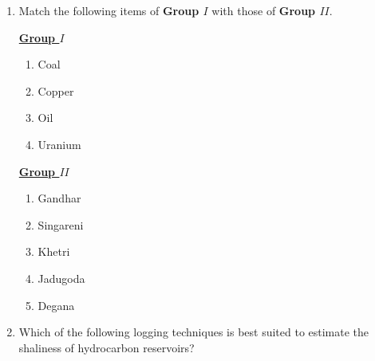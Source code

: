 \documentclass[journal,12pt,onecolumn]{IEEEtran}
\theoremstyle{remark}
\begin{document}
\begin{enumerate}
        \item Match the following items of \textbf{Group $I$} with those of \textbf{Group $II$}. \hfill{}

        \begin{multicols}{2}
            \underline{\textbf{Group $I$}}
            \begin{enumerate}[start =16]
                \item Coal
                \item Copper
                \item Oil
                \item Uranium
            \end{enumerate}

            \columnbreak

            \underline{\textbf{Group $II$}}
            \begin{enumerate}
                \item Gandhar
                \item Singareni
                \item Khetri
                \item Jadugoda
                \item Degana
            \end{enumerate}
        \end{multicols} 

        \begin{enumerate}
        \end{enumerate}
        
        \item Which of the following logging techniques is best suited to estimate the shaliness of hydrocarbon reservoirs? \hfill{}
            \begin{enumerate}
            \end{enumerate}


\end{enumerate}
\end{document}
